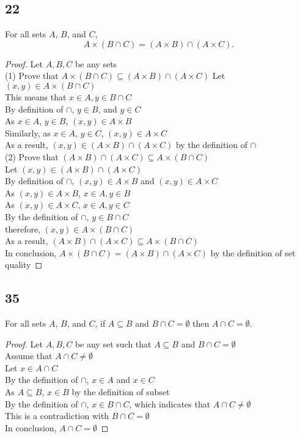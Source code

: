 \documentclass{article}
\begin{document}
\subsection{22}
For all sets $A$, $B$, and $C$,
\[ A \times (B \cap C) = (A \times B) \cap (A \times C). \]
\begin{proof}
    Let $A,B,C$ be any sets\\
    (1) Prove that $A \times (B \cap C) \subseteq (A \times B) \cap (A \times C)$
    Let $(x,y) \in A \times (B \cap C)$\\
    This means that $x \in A, y \in B \cap C$\\
    By definition of $\cap$, $y \in B$, and $y \in C$\\
    As $x\in A$, $y \in B$, $(x,y) \in A \times B$\\
    Similarly, as $x\in A$, $y \in C$, $(x,y) \in A \times C$\\
    As a result, $(x,y) \in (A \times B) \cap (A \times C)$ by the definition of $\cap$\\
    (2) Prove that $(A \times B) \cap (A \times C) \subseteq A \times (B \cap C)$\\
    Let $(x,y) \in (A \times B) \cap (A \times C)$\\
    By definition of $\cap$, $(x,y) \in A \times B$ and $(x,y) \in A\times C$\\
    As $(x,y) \in A \times B$, $x \in A, y \in B$\\
    As $(x,y) \in A\times C$, $x \in A, y \in C$\\
    By the definition of $\cap$, $y \in B \cap C$\\
    therefore, $(x,y) \in A \times (B \cap C)$\\
    As a result, $(A \times B) \cap (A \times C) \subseteq A \times (B \cap C)$\\
    In conclusion, $ A \times (B \cap C) = (A \times B) \cap (A \times C)$ by the definition of set quality
\end{proof}

\subsection{35}
For all sets $A$, $B$, and $C$, if $A \subseteq B$ and $B \cap C = \emptyset$ then $A \cap C = \emptyset$.
\begin{proof}
    Let $A, B, C$ be any set such that $A \subseteq B$ and $B \cap C = \emptyset$\\
    Assume that $A \cap C \neq \emptyset$\\
    Let $x \in A \cap C$\\
    By the definition of $\cap$, $x \in A$ and $x \in C$\\
    As $A \subseteq B$, $x \in B$ by the definition of subset\\
    By the definition of $\cap$, $x \in B \cap C$, which indicates that $A \cap C \neq \emptyset$\\
    This is a contradiction with $B \cap C = \emptyset$\\
    In conclusion, $A \cap C = \emptyset$
\end{proof}
\end{document}
